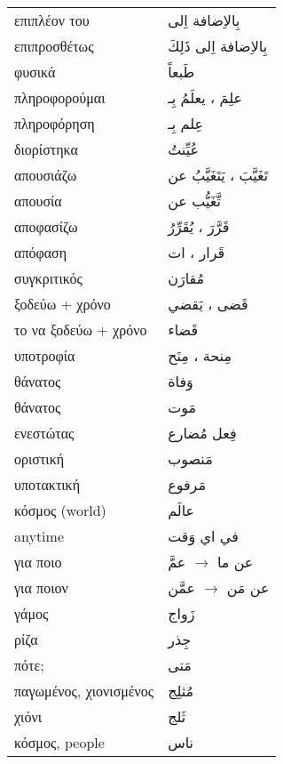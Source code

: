 \documentclass[twocolumn,a4paper]{article}
\newcommand{\ar}[1]{\textarabic{#1}}
\newcommand{\pl}{\raisebox{0.15ex}{\footnotesize ◍}}
\newcommand{\normpl}[1]{\ar{ #1، ات }}
\newcommand{\vrf}{\raisebox{0.15ex}{\footnotesize ◉}}
\newcommand{\vr}{\raisebox{0.15ex}{\footnotesize ◎}}
\newcommand{\mas}{\raisebox{0.15ex}{\footnotesize ◫}}
\begin{document}
\begin{mpsupertabular}{ P{0.5\textwidth} P{0.5\textwidth} }
επιπλέον του                 & \ar{ بِاﻻِضافة اِلى } \\
επιπροσθέτως                 & \ar{ بِاﻻِضافة اِلى ذَلِكَ } \\
φυσικά                       & \ar{ طَبعاً } \\
πληροφορούμαι \vrf           & \ar{ علِمَ ، يعلَمُ بِـ } \\
πληροφόρηση \mas             & \ar{ عِلم بِـ } \\
διορίστηκα \vr               & \ar{ عُيِّنتُ } \\
απουσιάζω \vrf               & \ar{ تَغَيَّبَ ، يَتَغَيَّبُ عن } \\
απουσία \mas                 & \ar{ تَّغَيُّب عن } \\
αποφασίζω \vrf               & \ar{ قَرَّرَ ، يُقَرِّرُ } \\
απόφαση \pl                  & \normpl{ قَرار } \\
συγκριτικός                  & \ar{ مُقارَن } \\
ξοδεύω + χρόνο \vrf          & \ar{ قَضى ، يَقضي } \\
το να ξοδεύω + χρόνο \mas    & \ar{ قَضاء } \\
υποτροφία \pl                & \ar{ مِنحة ، مِنَح } \\
θάνατος                      & \ar{ وَفاة } \\
θάνατος                      & \ar{ مَوت } \\

ενεστώτας                    & \ar{ فِعل مُضارع } \\
οριστική                     & \ar{ مَنصوب } \\
υποτακτική                   & \ar{ مَرفوع } \\
κόσμος (world)               & \ar{ عالَم } \\
anytime                      & \ar{ في اي وَقت } \\
για ποιο                     & \ar{ عن ما } $\rightarrow$ \ar{ عمَّ } \\
για ποιον                    & \ar{ عن مَن } $\rightarrow$ \ar{ عمَّن} \\
γάμος                        & \ar{ زَواج } \\
ρίζα                         & \ar{ جِذر } \\
πότε;                        & \ar{ مَتى } \\
παγωμένος, χιονισμένος       & \ar{ مُثلِج } \\
χιόνι                        & \ar{ ثَلج } \\
κόσμος, people               & \ar{ ناس } \\


\end{mpsupertabular}
\end{document}

